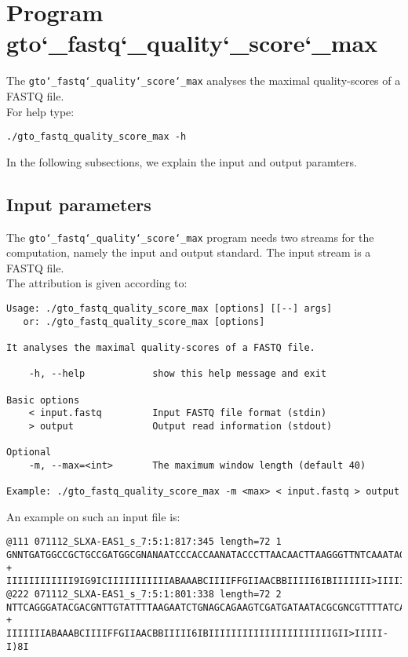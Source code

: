 \section{Program gto\char`_fastq\char`_quality\char`_score\char`_max}
The \texttt{gto\char`_fastq\char`_quality\char`_score\char`_max} analyses the maximal quality-scores of a FASTQ file.\\
For help type:
\begin{lstlisting}
./gto_fastq_quality_score_max -h
\end{lstlisting}
In the following subsections, we explain the input and output paramters.

\subsection*{Input parameters}

The \texttt{gto\char`_fastq\char`_quality\char`_score\char`_max} program needs two streams for the computation, namely the input and output standard. The input stream is a FASTQ file.\\
The attribution is given according to:
\begin{lstlisting}
Usage: ./gto_fastq_quality_score_max [options] [[--] args]
   or: ./gto_fastq_quality_score_max [options]

It analyses the maximal quality-scores of a FASTQ file.

    -h, --help            show this help message and exit

Basic options
    < input.fastq         Input FASTQ file format (stdin)
    > output              Output read information (stdout)

Optional
    -m, --max=<int>       The maximum window length (default 40)

Example: ./gto_fastq_quality_score_max -m <max> < input.fastq > output
\end{lstlisting}
An example on such an input file is:
\begin{lstlisting}
@111 071112_SLXA-EAS1_s_7:5:1:817:345 length=72 1
GNNTGATGGCCGCTGCCGATGGCGNANAATCCCACCAANATACCCTTAACAACTTAAGGGTTNTCAAATAGA
+
IIIIIIIIIIII9IG9ICIIIIIIIIIIIABAAABCIIIIFFGIIAACBBIIIII6IBIIIIIII>IIIIII/
@222 071112_SLXA-EAS1_s_7:5:1:801:338 length=72 2
NTTCAGGGATACGACGNTTGTATTTTAAGAATCTGNAGCAGAAGTCGATGATAATACGCGNCGTTTTATCAN
+
IIIIIIIABAAABCIIIIFFGIIAACBBIIIII6IBIIIIIIIIIIIIIIIIIIIIIIGII>IIIII-I)8I
\end{lstlisting}

